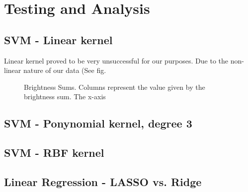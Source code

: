 \documentclass{article}
\begin{document}
\section{Testing and Analysis}
\subsection{SVM - Linear kernel}
Linear kernel proved to be very unsuccessful for our purposes. Due to the non-linear nature of our data (See fig. 

\begin{figure}[H]
\centering
\setlength\fboxsep{2pt}
\setlength\fboxrule{0pt}
\caption{
Brightness Sums. Columns represent the value given by the brightness sum. The x-axis
}
\end{figure}

\subsection{SVM - Ponynomial kernel, degree 3}

\subsection{SVM - RBF kernel}


\subsection{Linear Regression - LASSO vs. Ridge}
\end{document}

